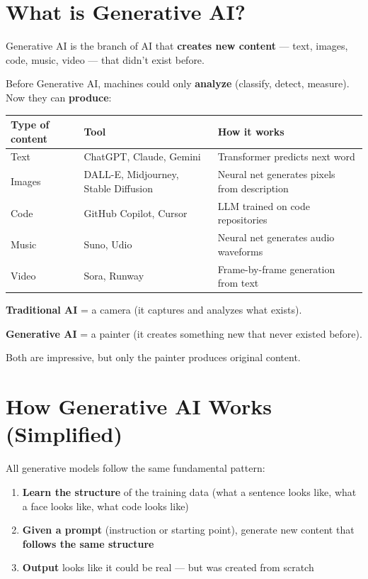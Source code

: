 \documentclass[11pt,a4paper]{report}
\begin{document}
\section{What is Generative AI?}

Generative AI is the branch of AI that \textbf{creates new content} --- text, images, code, music, video --- that didn't exist before.

Before Generative AI, machines could only \textbf{analyze} (classify, detect, measure). Now they can \textbf{produce}:

\begin{table}[h]
\centering
\begin{tabularx}{\textwidth}{X X X}
\toprule
\textbf{Type of content} & \textbf{Tool} & \textbf{How it works} \\
\midrule
Text & ChatGPT, Claude, Gemini & Transformer predicts next word \\
Images & DALL-E, Midjourney, Stable Diffusion & Neural net generates pixels from description \\
Code & GitHub Copilot, Cursor & LLM trained on code repositories \\
Music & Suno, Udio & Neural net generates audio waveforms \\
Video & Sora, Runway & Frame-by-frame generation from text \\
\bottomrule
\end{tabularx}
\end{table}

\begin{analogybox}
\textbf{Traditional AI} = a camera (it captures and analyzes what exists).

\textbf{Generative AI} = a painter (it creates something new that never existed before).

Both are impressive, but only the painter produces original content.
\end{analogybox}

\section{How Generative AI Works (Simplified)}

All generative models follow the same fundamental pattern:

\begin{enumerate}
    \item \textbf{Learn the structure} of the training data (what a sentence looks like, what a face looks like, what code looks like)
    \item \textbf{Given a prompt} (instruction or starting point), generate new content that \textbf{follows the same structure}
    \item \textbf{Output} looks like it could be real --- but was created from scratch
\end{enumerate}
\end{document}
